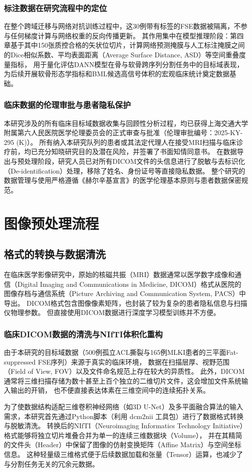     \subsubsection{标注数据在研究流程中的定位}
      在整个跨域迁移与网络对抗训练过程中，这30例带有标签的FSE数据被隔离，不参与任何梯度计算与网络权重的反向传播更新。
      其作用集中在模型推理阶段：第四章基于其中150张质控合格的矢状位切片，计算网络预测掩膜与人工标注掩膜之间的Dice相似系数、平均表面距离（Average Surface Distance, ASD）等空间重叠度量指标，
      用于量化评估DANN模型在骨与软骨跨序列分割任务中的目标域表现，
      为后续开展软骨形态学指标和BML候选高信号体积的宏观临床统计奠定数据基础。
    \subsubsection{临床数据的伦理审批与患者隐私保护}
      本研究涉及的所有临床目标域数据收集与回顾性分析过程，均已获得上海交通大学附属第六人民医院医学伦理委员会的正式审查与批准（伦理审批编号：2025-KY-295 (K)）。
      所有纳入本研究队列的患者或其法定代理人在接受MRI扫描与临床诊疗前，均已充分知晓研究目的及潜在风险，并签署了书面知情同意书。
      在数据导出与预处理阶段，研究人员已对所有DICOM文件的头信息进行了脱敏与去标识化（De-identification）处理，移除了姓名、身份证号等直接隐私数据。
      整个研究的数据管理与使用严格遵循《赫尔辛基宣言》的医学伦理基本原则与患者数据保密规范。
\section{图像预处理流程}
  \subsection{格式的转换与数据清洗}
    在临床医学影像研究中，原始的核磁共振（MRI）数据通常以医学数字成像和通信（Digital Imaging and Communications in Medicine, DICOM）格式从医院的图像存档与通信系统（Picture Archiving and Communication System, PACS）中导出。
    DICOM格式包含图像像素矩阵，也封装了较为复杂的患者隐私信息与扫描仪物理参数。
    但直接使用DICOM数据进行深度学习模型训练并不方便。
    \subsubsection{临床DICOM数据的清洗与NIfTI体积化重构}
      \par 由于本研究的目标域数据（500例孤立ACL撕裂与165例MLKI患者的三平面Fat-suppressed FSE序列）来源于真实的临床环境，
      数据在扫描层厚、视野范围（Field of View, FOV）以及文件命名规范上存在较大的异质性。
      此外，DICOM通常将三维扫描存储为数十甚至上百个独立的二维切片文件，这会增加文件系统输入输出的开销，
      也不便直接表达体素在三维空间中的连续拓扑关系。
      \par 为了使数据结构适配三维卷积神经网络（如3D U-Net）及多平面融合算法的输入需求，本研究首先通过Python脚本（利用 dcm2nii 工具包）进行了数据格式转换与脱敏清洗。
      转换后的NIfTI（Neuroimaging Informatics Technology Initiative）格式能够将独立切片堆叠合并为单一的连续三维数据块（Volume），
      并在其精简的文件头（Header）中保留了图像的仿射变换矩阵（Affine Matrix）与空间坐标信息。
      这种轻量级三维格式便于后续数据加载和张量（Tensor）运算，也减少了与分割任务无关的冗余元数据。
